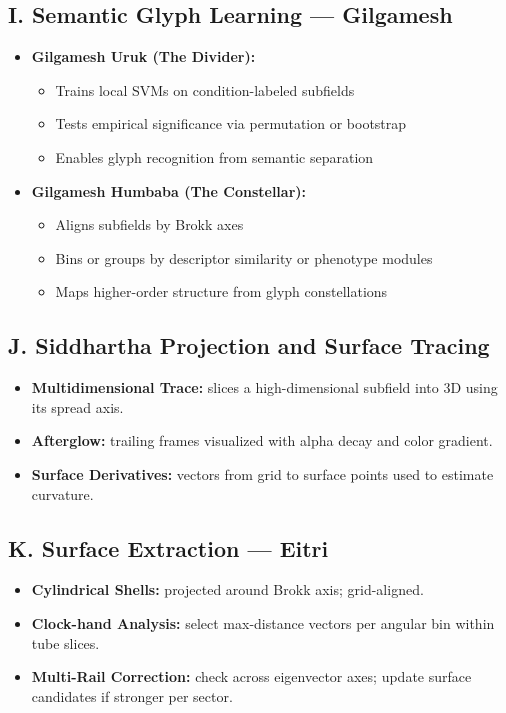 \documentclass{article}
\begin{document}
\subsection*{I. Semantic Glyph Learning — Gilgamesh}
\begin{itemize}[leftmargin=1.5em]
  \item \textbf{Gilgamesh Uruk (The Divider):}
    \begin{itemize}
      \item Trains local SVMs on condition-labeled subfields
      \item Tests empirical significance via permutation or bootstrap
      \item Enables glyph recognition from semantic separation
    \end{itemize}
  \item \textbf{Gilgamesh Humbaba (The Constellar):}
    \begin{itemize}
      \item Aligns subfields by Brokk axes
      \item Bins or groups by descriptor similarity or phenotype modules
      \item Maps higher-order structure from glyph constellations
    \end{itemize}
\end{itemize}

\subsection*{J. Siddhartha Projection and Surface Tracing}
\begin{itemize}[leftmargin=1.5em]
  \item \textbf{Multidimensional Trace:} slices a high-dimensional subfield into 3D using its spread axis.
  \item \textbf{Afterglow:} trailing frames visualized with alpha decay and color gradient.
  \item \textbf{Surface Derivatives:} vectors from grid to surface points used to estimate curvature.
\end{itemize}

\subsection*{K. Surface Extraction — Eitri}
\begin{itemize}[leftmargin=1.5em]
  \item \textbf{Cylindrical Shells:} projected around Brokk axis; grid-aligned.
  \item \textbf{Clock-hand Analysis:} select max-distance vectors per angular bin within tube slices.
  \item \textbf{Multi-Rail Correction:} check across eigenvector axes; update surface candidates if stronger per sector.
\end{itemize}
\end{document}
